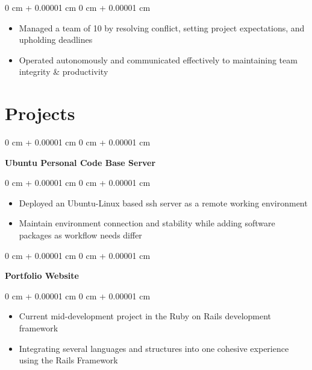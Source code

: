 \documentclass[10pt, letterpaper]{article}
\newenvironment{highlights}{
    \begin{itemize}[
        topsep=0.10 cm,
        parsep=0.10 cm,
        partopsep=0pt,
        itemsep=0pt,
        leftmargin=0 cm + 10pt
    ]
}{
    \end{itemize}
} %
\newenvironment{onecolentry}{
    \begin{adjustwidth}{
        0 cm + 0.00001 cm
    }{
        0 cm + 0.00001 cm
    }
}{
    \end{adjustwidth}
} %
\newenvironment{twocolentry}[2][]{
    \onecolentry%
    \def\secondColumn{#2}
    \setcolumnwidth{\fill, 4.5 cm}
    \begin{paracol}{2}
}{
    \switchcolumn\raggedleft\secondColumn%
    \end{paracol}
    \endonecolentry%
} %
\begin{document}
        \vspace{0.10 cm}
        \begin{onecolentry}
            \begin{highlights}
                \item Managed a team of 10 by resolving conflict, setting project expectations, and upholding deadlines
                \item Operated autonomously and communicated effectively to maintaining team integrity \& productivity
            \end{highlights}
        \end{onecolentry}
    
    {\color{secondaryColor}\section{Projects}}



        
        \begin{onecolentry}
            \textbf{Ubuntu Personal Code Base Server}
        \end{onecolentry}

            

        \vspace{0.10 cm}
        \begin{onecolentry}
            \begin{highlights}
                \item Deployed an Ubuntu-Linux based ssh server as a remote working environment
                \item Maintain environment connection and stability while adding software packages as workflow needs differ
            \end{highlights}
        \end{onecolentry}


        \vspace{0.2 cm}

        \begin{twocolentry}{
            \href{https://github.com/sinaatalay/rendercv}{\color{secondaryColor}{github.com/name/repo}}
        }
            \textbf{Portfolio Website}\end{twocolentry}

        \vspace{0.10 cm}
        \begin{onecolentry}
            \begin{highlights}
                \item Current mid-development project in the Ruby on Rails development framework
                \item Integrating several languages and structures into one cohesive experience using the Rails Framework
            \end{highlights}
        \end{onecolentry}
\end{document}

